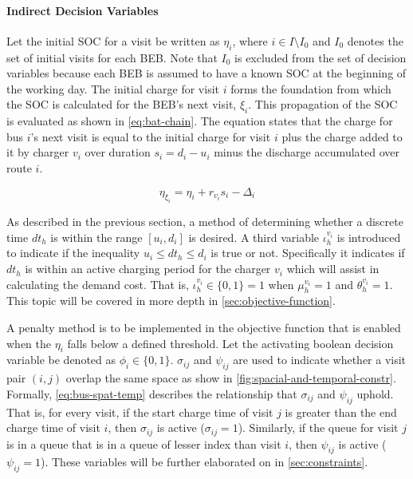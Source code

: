\documentclass[11pt,a4paper,final]{article}
\newcommand{\Iset}{I}                       %
\begin{document}
\paragraph{Indirect Decision Variables}
\label{sec:indirect-decision-variables}
Let the initial SOC for a visit be written as \(\eta_i\), where \(i \in \Iset \setminus \Iset_0\) and \(\Iset_0\) denotes the set of
initial visits for each BEB. Note that \(\Iset_0\) is excluded from the set of decision variables because each BEB is
assumed to have a known SOC at the beginning of the working day. The initial charge for visit \(i\) forms the foundation
from which the SOC is calculated for the BEB's next visit, \(\xi_i\). This propagation of the SOC is evaluated as shown in
\ref{eq:bat-chain}. The equation states that the charge for bus \(i\)'s next visit is equal to the initial charge for visit \(i\)
plus the charge added to it by charger \(v_i\) over duration \(s_i = d_i - u_i\) minus the discharge accumulated over route
\(i\).

\begin{equation}
\label{eq:bat-chain}
  \eta_{\xi_i} = \eta_i + r_{v_i}s_i - \Delta_i
\end{equation}

As described in the previous section, a method of determining whether a discrete time \(dt_h\) is within the range \([u_i,
d_i]\) is desired. A third variable \(\iota_h^{v_i}\) is introduced to indicate if the inequality \(u_i \le dt_h \le d_i\) is true or
not. Specifically it indicates if \(dt_h\) is within an active charging period for the charger \(v_i\) which will assist in
calculating the demand cost. That is, \(\iota_h^{v_i} \in \{0,1\} = 1\) when \(\mu_h^{v_i} = 1\) and \(\theta_h^{v_i} = 1\). This topic
will be covered in more depth in \ref{sec:objective-function}.

A penalty method is to be implemented in the objective function that is enabled when the \(\eta_i\) falls below a defined
threshold. Let the activating boolean decision variable be denoted as \(\phi_i \in \{0,1\}\). \(\sigma_{ij}\) and \(\psi_{ij}\) are used to
indicate whether a visit pair \((i, j)\) overlap the same space as show in \ref{fig:spacial-and-temporal-constr}. Formally,
\ref{eq:bus-spat-temp} describes the relationship that \(\sigma_{ij}\) and \(\psi_{ij}\) uphold. That is, for every visit, if the start
charge time of visit \(j\) is greater than the end charge time of visit \(i\), then \(\sigma_{ij}\) is active (\(\sigma_{ij} = 1\)).
Similarly, if the queue for visit \(j\) is in a queue that is in a queue of lesser index than visit \(i\), then \(\psi_{ij}\) is
active (\(\psi_{ij} = 1\)). These variables will be further elaborated on in \ref{sec:constraints}.
\end{document}
